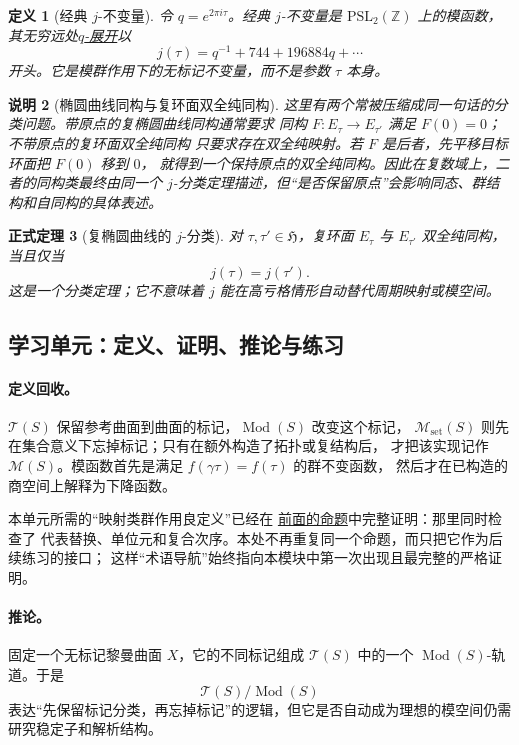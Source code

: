 \documentclass[UTF8,fontset=none,a4paper,11pt]{ctexart}
\theoremstyle{foundation-definition}
\newtheorem{definition}{定义}[section]
\theoremstyle{foundation-theorem}
\newtheorem{theorem}[definition]{正式定理}
\theoremstyle{foundation-proposition}
\theoremstyle{foundation-example}
\theoremstyle{foundation-remark}
\newtheorem{remark}[definition]{说明}
\theoremstyle{foundation-theorem}
\newcommand{\T}{\mathcal T}
\newcommand{\M}{\mathcal M}
\newcommand{\Mod}{\operatorname{Mod}}
\newcommand{\term}[2]{\hyperref[#1]{#2}}
\begin{document}
\begin{definition}[经典 \(j\)-不变量]\label{def:j-invariant}
令 \(q=e^{2\pi i\tau}\)。经典 \(j\)-不变量是 \(\mathrm{PSL}_2(\mathbb Z)\) 上的模函数，其无穷远处\term{def:q-expansion}{\(q\)-展开}以
\[
j(\tau)=q^{-1}+744+196884q+\cdots
\]
开头。它是模群作用下的无标记不变量，而不是参数 \(\tau\) 本身。
\end{definition}

\begin{remark}[椭圆曲线同构与复环面双全纯同构]
这里有两个常被压缩成同一句话的分类问题。带原点的复椭圆曲线同构通常要求
同构 \(F:E_\tau\to E_{\tau'}\) 满足 \(F(0)=0\)；不带原点的复环面双全纯同构
只要求存在双全纯映射。若 \(F\) 是后者，先平移目标环面把 \(F(0)\) 移到 \(0\)，
就得到一个保持原点的双全纯同构。因此在复数域上，二者的同构类最终由同一个
\(j\)-分类定理描述，但“是否保留原点”会影响同态、群结构和自同构的具体表述。
\end{remark}

\begin{theorem}[复椭圆曲线的 \(j\)-分类]
对 \(\tau,\tau'\in\mathfrak H\)，复环面 \(E_\tau\) 与 \(E_{\tau'}\) 双全纯同构，当且仅当
\[
j(\tau)=j(\tau').
\]
这是一个分类定理；它不意味着 \(j\) 能在高亏格情形自动替代周期映射或模空间。
\end{theorem}

\subsection{学习单元：定义、证明、推论与练习}

\paragraph{定义回收。}
\(\T(S)\) 保留参考曲面到曲面的标记，\(\Mod(S)\) 改变这个标记，
\(\M_{\mathrm{set}}(S)\) 则先在集合意义下忘掉标记；只有在额外构造了拓扑或复结构后，
才把该实现记作 \(\M(S)\)。模函数首先是满足 \(f(\gamma\tau)=f(\tau)\) 的群不变函数，
然后才在已构造的商空间上解释为下降函数。

本单元所需的“映射类群作用良定义”已经在
\term{prop:teich-action-well-defined}{前面的命题}中完整证明：那里同时检查了
代表替换、单位元和复合次序。本处不再重复同一个命题，而只把它作为后续练习的接口；
这样“术语导航”始终指向本模块中第一次出现且最完整的严格证明。

\paragraph{推论。}
固定一个无标记黎曼曲面 \(X\)，它的不同标记组成 \(\T(S)\) 中的一个 \(\Mod(S)\)-轨道。于是
\[
\T(S)/\Mod(S)
\]
表达“先保留标记分类，再忘掉标记”的逻辑，但它是否自动成为理想的模空间仍需研究稳定子和解析结构。
\end{document}
